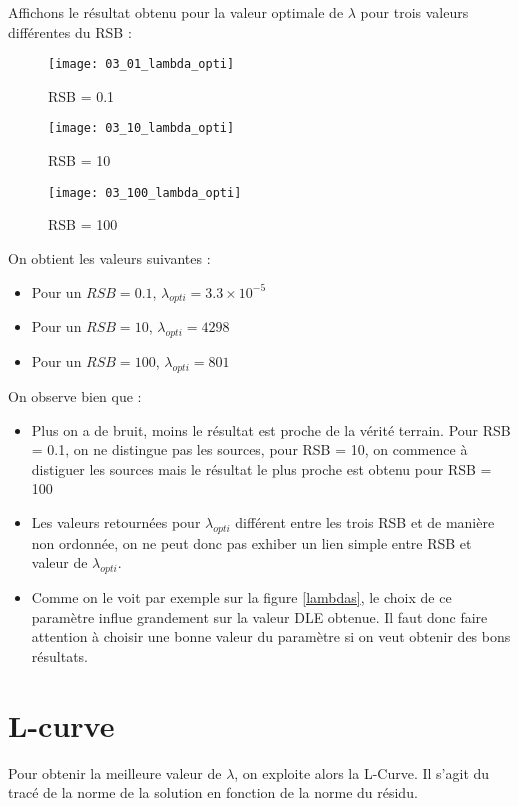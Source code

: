 \documentclass[12pt,a4paper,titlepage]{article}
\begin{document}
Affichons le résultat obtenu pour la valeur optimale de $\lambda$
pour trois valeurs différentes du RSB :

\begin{figure}[H]
    \caption{RSB = 0.1}
    \label{brain}
    \texttt{[image: 03\_01\_lambda\_opti]}
    \centering
\end{figure}

\begin{figure}[H]
    \caption{RSB = 10}
    \label{brain}
    \texttt{[image: 03\_10\_lambda\_opti]}
    \centering
\end{figure}

\begin{figure}[H]
    \caption{RSB = 100}
    \label{brain}
    \texttt{[image: 03\_100\_lambda\_opti]}
    \centering
\end{figure}

On obtient les valeurs suivantes :

\begin{itemize}
    \item{Pour un $RSB = 0.1$, $ \lambda_{opti} = 3.3 \times 10^{-5} $}
    \item{Pour un $RSB = 10$, $ \lambda_{opti} = 4298 $}
    \item{Pour un $RSB = 100$, $ \lambda_{opti} = 801 $}
\end{itemize}

On observe bien que :

\begin{itemize}
    \item{Plus on a de bruit, moins le résultat est proche de la vérité terrain.
        Pour RSB = 0.1, on ne distingue pas les sources, pour RSB = 10, on commence à distiguer
        les sources mais le résultat le plus proche est obtenu pour RSB = 100}
    \item{Les valeurs retournées pour $\lambda_{opti}$ différent entre les trois RSB et de manière non ordonnée,
        on ne peut donc pas exhiber un lien simple entre RSB et valeur de $\lambda_{opti}$.}
    \item{Comme on le voit par exemple sur la figure \ref{lambdas}, le choix de ce paramètre
        influe grandement sur la valeur DLE obtenue. Il faut donc faire attention à choisir une bonne valeur du paramètre
        si on veut obtenir des bons résultats.}
\end{itemize}

\section{L-curve}

Pour obtenir la meilleure valeur de $\lambda$,  on exploite alors
la L-Curve. Il s'agit du tracé de la norme de la solution en fonction
de la norme du résidu.
\end{document}
